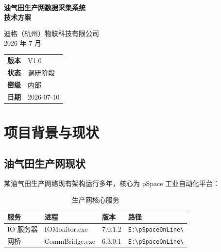 \documentclass[12pt,a4paper]{ctexart}
\begin{document}
\begin{titlepage}
\centering
\vspace*{4cm}

{\Huge \textbf{油气田生产网数据采集系统}}\\[12pt]
{\LARGE \textbf{技术方案}}

\vspace{2cm}

{\large 迪格（杭州）物联科技有限公司}\\[6pt]
{\large 2026 年 7 月}

\vspace{1cm}

\begin{tabular}{rl}
\textbf{版本} & V1.0 \\
\textbf{状态} & 调研阶段 \\
\textbf{密级} & 内部 \\
\textbf{日期} & 2026-07-10 \\
\end{tabular}

\vfill
\end{titlepage}

\newpage
\tableofcontents
\newpage

\section{项目背景与现状}

\subsection{油气田生产网现状}

某油气田生产网络现有架构运行多年，核心为 pSpace 工业自动化平台：

\begin{table}[H]\centering
\caption{生产网核心服务}
\begin{tabular}{p{2.2cm} p{3.2cm} p{1.8cm} p{5.5cm}}
\toprule
\textbf{服务} & \textbf{进程} & \textbf{版本} & \textbf{路径} \\
\midrule
IO 服务器 & IOMonitor.exe & 7.0.1.2 & \texttt{E:\textbackslash pSpaceOnLine\textbackslash} \\
网桥 & CommBridge.exe & 6.3.0.1 & \texttt{E:\textbackslash pSpaceOnLine\textbackslash} \\
\bottomrule
\end{tabular}
\end{table}
\end{document}
